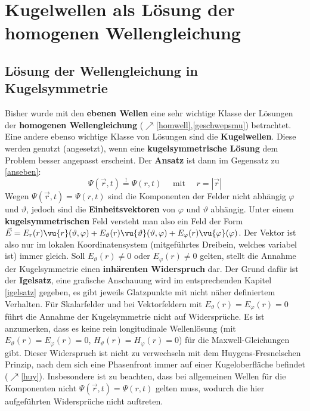  \section{Kugelwellen als Lösung der homogenen Wellengleichung}\label{kugwell}
 \subsection{Lösung der Wellengleichung in Kugelsymmetrie}
  Bisher wurde mit den \textbf{ebenen Wellen} eine sehr wichtige Klasse der Lösungen der \textbf{homogenen Wellengleichung} ($\nearrow$\ref{homwell},\ref{geschwepsmu}) betrachtet. Eine andere ebenso wichtige Klasse von Lösungen sind die \textbf{Kugelwellen}. Diese werden genutzt (angesetzt), wenn eine \textbf{kugelsymmetrische Lösung} dem Problem besser angepasst erscheint. Der \textbf{Ansatz} ist dann im Gegensatz zu \ref{anseben}:
		        \begin{equation}
			        \boxed{\Psi(\vec{r} ,t) \stackrel{!}{=} \Psi(r,t)} \quad\text{ mit } \quad r = |\vec{r} |
		        \end{equation}
 Wegen $\Psi (\vec{r},t)=\Psi (r,t)$ sind die Komponenten der Felder nicht abhängig $\varphi$ und $\vartheta$, jedoch sind die \textbf{Einheitsvektoren} von $\varphi$ und $\vartheta$ abhängig. Unter einem \textbf{kugelsymmetrischen} Feld versteht man also ein Feld der Form $\vec{E}=E_r (r) \vu{r}(\vartheta,\varphi)+ E_\vartheta (r) \vu{\vartheta}(\vartheta,\varphi) + E_\varphi (r) \vu{\varphi}(\varphi)$. Der Vektor ist also nur im lokalen Koordinatensystem (mitgeführtes Dreibein, welches variabel ist) immer gleich. Soll $E_\vartheta (r)\neq0$ oder $E_\varphi (r)\neq0$ gelten, stellt die Annahme der Kugelsymmetrie einen \textbf{inhärenten Widerspruch} dar. Der Grund dafür ist der \textbf{Igelsatz}, eine grafische Anschauung wird im entsprechenden Kapitel \ref{igelsatz} gegeben, es gibt jeweils Glatzpunkte mit nicht näher definiertem Verhalten. Für Skalarfelder und bei Vektorfeldern mit $E_\vartheta (r)=E_\varphi (r)=0$ führt die Annahme der Kugelsymmetrie nicht auf Widersprüche. Es ist anzumerken, dass es keine rein longitudinale Wellenlösung (mit $E_\vartheta (r)=E_\varphi (r)=0$, $H_\vartheta (r)=H_\varphi (r)=0$) für die Maxwell-Gleichungen gibt. Dieser Widerspruch ist nicht zu verwechseln mit dem Huygens-Fresnelschen Prinzip, nach dem sich eine Phasenfront immer auf einer Kugeloberfläche befindet ($\nearrow$\ref{huy}). Insbesondere ist zu beachten, dass bei allgemeinen Wellen für die Komponenten nicht $\Psi(\vec{r},t)=\Psi(r,t)$ gelten muss, wodurch die hier aufgeführten Widersprüche nicht auftreten. \\
